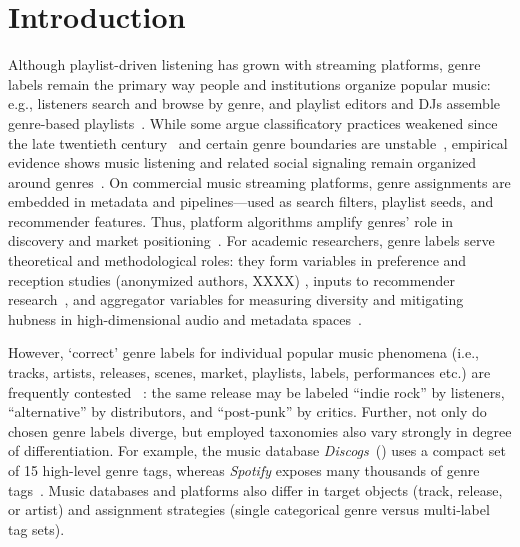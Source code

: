 \documentclass{article}
\begin{document}
\section{Introduction}\label{sec:intro}

Although playlist-driven listening has grown with streaming platforms, genre labels remain the primary way people and institutions organize popular music: e.g., listeners search and browse by genre, and playlist editors and DJs assemble genre-based playlists~\citep{boniniPlatformedHowStreaming2024}. While some argue classificatory practices weakened since the late twentieth century~\citep{dimaggioClassificationArt1987} and certain genre boundaries are unstable~\citep{silverGenreComplexesPopular2016}, empirical evidence shows music listening and related social signaling remain organized around genres~\citep{airoldiFollowAlgorithmExploratory2016, lonsdaleMusicalTasteIngroup2021}. On commercial music streaming platforms, genre assignments are embedded in metadata and pipelines—used as search filters, playlist seeds, and recommender features. Thus, platform algorithms amplify genres' role in discovery and market positioning~\citep{valverdeInequityDesignMusic2025}. For academic researchers, genre labels serve theoretical and methodological roles: they form variables in preference and reception studies (anonymized authors, XXXX) %
, inputs to recommender research~\citep{porcaroAssessingImpactMusic2024}, and aggregator variables for measuring diversity and mitigating hubness in high-dimensional audio and metadata spaces~\citep{flexerProblemLimitedInterrater2016, flexerHubnessCaseTechnical2018}.

However, `correct' genre labels for individual popular music phenomena (i.e., tracks, artists, releases, scenes, market, playlists, labels, performances etc.) are frequently contested
~\citep{palmasonMusicGenreClassification2018}:
the same release may be labeled ``indie rock'' by listeners, ``alternative'' by distributors, and ``post‑punk'' by critics. Further, not only do chosen genre labels diverge, but employed taxonomies also vary strongly in degree of differentiation. For example, the music database \textit{Discogs}~(\citeyear{Discogs2024}) uses a compact set of 15 high-level genre tags, whereas \textit{Spotify} exposes many thousands of genre tags~\citep{mcdonaldEveryNoiseOnce_nodate}. Music databases and platforms also differ in target objects (track, release, or artist) and assignment strategies (single categorical genre versus multi‑label tag sets).
\end{document}
